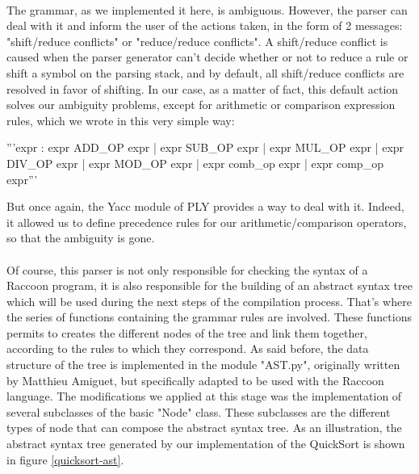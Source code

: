 \documentclass[12pt,a4paper]{article}
\begin{document}
\paragraph{}
The grammar, as we implemented it here, is ambiguous. However, the parser can deal with it and inform the user of the actions taken, in the form of 2 messages: "shift/reduce conflicts" or "reduce/reduce conflicts". A shift/reduce conflict is caused when the parser generator can't decide whether or not to reduce a rule or shift a symbol on the parsing stack, and by default, all shift/reduce conflicts are resolved in favor of shifting. In our case, as a matter of fact, this default action solves our ambiguity problems, except for arithmetic or comparison expression rules, which we wrote in this very simple way:
\begin{verbatimtab}[4]
	'''expr : expr ADD_OP expr
			| expr SUB_OP expr
			| expr MUL_OP expr
			| expr DIV_OP expr
			| expr MOD_OP expr
			| expr comb_op expr
			| expr comp_op expr'''
\end{verbatimtab} 
But once again, the Yacc module of PLY provides a way to deal with it. Indeed, it allowed us to define precedence rules for our arithmetic/comparison operators, so that the ambiguity is gone.

\paragraph{}
Of course, this parser is not only responsible for checking the syntax of a Raccoon program, it is also responsible for the building of an abstract syntax tree which will be used during the next steps of the compilation process. That's where the series of functions containing the grammar rules are involved. These functions permits to creates the different nodes of the tree and link them together, according to the rules to which they correspond. As said before, the data structure of the tree is implemented in the module "AST.py", originally written by Matthieu Amiguet,  but specifically adapted to be used with the Raccoon language. The modifications we applied at this stage was the implementation of several subclasses of the basic "Node" class. These subclasses are the different types of node that can compose the abstract syntax tree. As an illustration, the abstract syntax tree generated by our implementation of the QuickSort is shown in figure \ref{quicksort-ast}.
\end{document}
